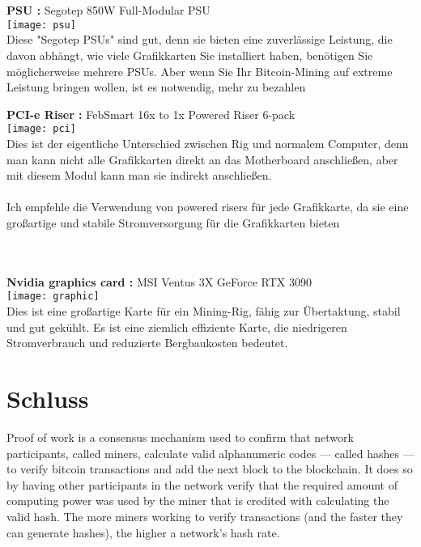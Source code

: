 \documentclass[ngerman]{scrreprt}
\begin{document}
\\ \\
\begin{large}
	\textbf{PSU :} Segotep 850W Full-Modular PSU \\ 
	\texttt{[image: psu]}  \\
	Diese "Segotep PSUs" sind gut, denn sie bieten eine zuverlässige Leistung, die davon abhängt, wie viele Grafikkarten Sie installiert haben, benötigen Sie möglicherweise mehrere PSUs. Aber wenn Sie Ihr Bitcoin-Mining auf extreme Leistung bringen wollen, ist es notwendig, mehr zu bezahlen \\
\end{large}
\newpage
\begin{large}
	\textbf{PCI-e Riser :} FebSmart 16x to 1x Powered Riser 6-pack \\ 
	\texttt{[image: pci]}  \\
	Dies ist der eigentliche Unterschied zwischen Rig und normalem Computer, denn man kann nicht alle Grafikkarten direkt an das Motherboard anschließen, aber mit diesem Modul kann man sie indirekt anschließen.\\ \\
	
	Ich empfehle die Verwendung von powered risers für jede Grafikkarte, da sie eine großartige und stabile Stromversorgung für die Grafikkarten bieten \\ \\ \\
	
	
\end{large}

\begin{large}
	\textbf{Nvidia graphics card :} MSI Ventus 3X GeForce RTX 3090
	 \\ 
	\texttt{[image: graphic]}  \\
	Dies ist eine großartige Karte für ein Mining-Rig, fähig zur Übertaktung, stabil und gut gekühlt. Es ist eine ziemlich effiziente Karte, die niedrigeren Stromverbrauch und reduzierte Bergbaukosten bedeutet. \\ 
	
	
\end{large}

\chapter{Schluss}
Proof of work is a consensus mechanism used to confirm that network participants, called miners, calculate valid alphanumeric codes — called hashes — to verify bitcoin transactions and add the next block to the blockchain. It does so by having other participants in the network verify that the required amount of computing power was used by the miner that is credited with calculating the valid hash. The more miners working to verify transactions (and the faster they can generate hashes), the higher a network's hash rate.
\end{document}
